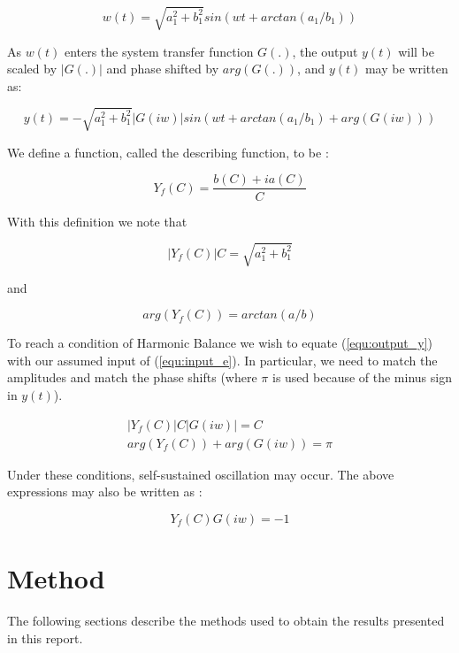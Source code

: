 \documentclass[a4paper, titlepage]{article}
\begin{document}
\begin{equation}
	w(t) = \sqrt{a_{1}^2+b_{1}^2}sin(wt+arctan(a_{1}/b_{1}))
\end{equation}

As $w(t)$ enters the system transfer function $G(.)$, the output $y(t)$ will be scaled by $|G(.)|$ and phase shifted by $arg(G(.))$, and $y(t)$ may be written as:

\begin{equation}
	y(t) = -\sqrt{a_{1}^2+b_{1}^2}|G(iw)|sin(wt+arctan(a_{1}/b_{1})+arg(G(iw)))
	\label{equ:output_y}
\end{equation}
 

We define a function, called the describing function, to be \citep[p. 358]{glad00}:

\begin{equation}
	Y_{f}(C) = \frac{b(C)+ia(C)}{C}
	\label{equ:descrbingFunction}
\end{equation}

With this definition we note that

\begin{equation}
	|Y_{f}(C)|C = \sqrt{a_{1}^2+b_{1}^2}
\end{equation}

and

\begin{equation}
	arg(Y_{f}(C)) = arctan(a/b)
\end{equation}

To reach a condition of Harmonic Balance we wish to equate (\ref{equ:output_y}) with our assumed input of (\ref{equ:input_e}).   
In particular, we need to match the amplitudes and match the phase shifts (where $\pi$ is used because of the minus sign in $y(t)$). 

\begin{equation}
\begin{split}
	|Y_{f}(C)|C|G(iw)| = C \\
	arg(Y_{f}(C))+arg(G(iw)) = \pi
\end{split}
\end{equation}

Under these conditions, self-sustained oscillation may occur.  The above expressions may also be written as \citep[p. 359]{glad00}:

\begin{equation}
	Y_{f}(C)G(iw) = -1
\label{equ:selfOsc}
\end{equation}
 
 
 
 
\section{Method}
The following sections describe the methods used to obtain the results presented in this report.
\end{document}
